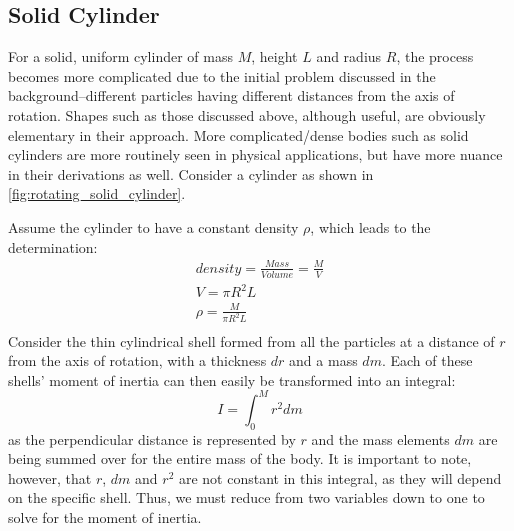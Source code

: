 \subsection{Solid Cylinder}

For a solid, uniform cylinder of mass $M$, height $L$ and radius $R$, the process becomes more complicated due to the initial problem discussed in the background--different particles having different distances from the axis of rotation. Shapes such as those discussed above, although useful, are obviously elementary in their approach. More complicated/dense bodies such as solid cylinders are more routinely seen in physical applications, but have more nuance in their derivations as well. Consider a cylinder as shown in \cref{fig:rotating_solid_cylinder}.



Assume the cylinder to have a constant density $\rho$, which leads to the determination:
\begin{gather*}
density = \frac{Mass}{Volume} = \frac{M}{V} \\
V = \pi R^2L \\
\rho = \frac{M}{\pi R^2L}\\
\end{gather*}
Consider the thin cylindrical shell formed from all the particles at a distance of $r$ from the axis of rotation, with a thickness $dr$ and a mass $dm$. Each of these shells' moment of inertia can then easily be transformed into an integral:
\begin{equation}
I = \int_0^M r^2dm
\end{equation}
as the perpendicular distance is represented by $r$ and the mass elements $dm$ are being summed over for the entire mass of the body. It is important to note, however, that $r$, $dm$ and $r^2$ are not constant in this integral, as they will depend on the specific shell. Thus, we must reduce from two variables down to one to solve for the moment of inertia.

